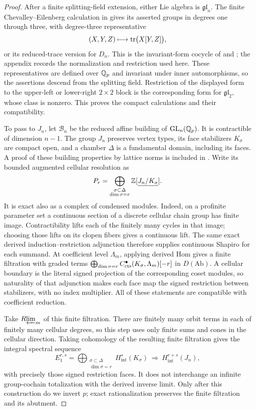 \begin{proof}
After a finite splitting-field extension, either Lie algebra is
$\mathfrak{gl}_n$.  The finite Chevalley--Eilenberg calculation in
 gives its asserted groups in degrees one through
three, with degree-three representative
\[
 (X,Y,Z)\longmapsto\operatorname{tr}\bigl(X[Y,Z]\bigr),
\]
or its reduced-trace version for $D_n$.
This is the invariant-form cocycle of
\cite[\S21]{ChevalleyEilenberg1948} and \cite[\S11]{Koszul1950};
the appendix records the normalization and restriction used here.
These representatives are defined over $\mathbb Q_p$ and invariant under
inner automorphisms, so the assertions descend from the splitting
field.  Restriction of the displayed form to the upper-left or
lower-right $2\times2$ block is the corresponding form for
$\mathfrak{gl}_2$, whose class is nonzero.  This proves the compact
calculations and their compatibility.

To pass to $J_n$, let $\mathcal B_n$ be the reduced affine building
of $\operatorname{GL}_n(\mathbb Q_p)$.  It is contractible of dimension $n-1$.
The group $J_n$ preserves vertex types, its face stabilizers
$K_\sigma$ are compact open, and a chamber $\Delta$ is a
fundamental domain, including its faces.  A proof of these building
properties by lattice norms is included in .
Write its bounded augmented cellular resolution as
\[
 P_r=\bigoplus_{\substack{\sigma\subset\Delta\\\dim\sigma=r}}
       \mathbb Z[\underline{J_n/K_\sigma}].
\]
It is exact also as a complex of condensed modules. Indeed, on a
profinite parameter set a continuous section of a discrete cellular
chain group has finite image. Contractibility lifts each of the finitely
many cycles in that image; choosing those lifts on its clopen fibers
gives a continuous lift. The same exact derived induction--restriction
adjunction therefore supplies continuous Shapiro for each summand.
At coefficient level \(\Lambda_m\), applying derived Hom gives a finite
filtration with graded terms
\(\bigoplus_{\dim\sigma=r}C_{\mathrm{cts}}^{\bullet}(K_\sigma,\Lambda_m)[-r]\)
in \(D(\mathrm{Ab})\).
A cellular boundary is the literal signed projection of the corresponding
coset modules, so naturality of that adjunction makes each face map the
signed restriction between stabilizers, with no index multiplier.
All of these statements are compatible with coefficient reduction.

Take \(R\!\varprojlim_m\) of this finite filtration. There are finitely many
orbit terms in each of finitely many cellular degrees, so this step uses
only finite sums and cones in the cellular direction. Taking cohomology of
the resulting finite filtration gives the integral spectral sequence
\[
 E_1^{r,s}=
 \bigoplus_{\substack{\sigma\subset\Delta\\\dim\sigma=r}}
 H^s_{\mathrm{int}}(K_\sigma)
 \ \Longrightarrow\ H^{r+s}_{\mathrm{int}}(J_n),
\]
with precisely those signed restriction faces. It does not interchange
an infinite group-cochain totalization with the derived inverse limit.
Only after this construction do we invert \(p\); exact rationalization
preserves the finite filtration and its abutment.


\end{proof}
